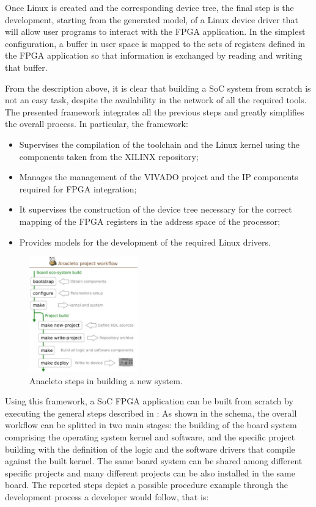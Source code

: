 Once Linux is created and the corresponding device tree, the final step is the development, starting from the generated model, of a Linux device driver that will allow user programs to interact with the FPGA application. In the simplest configuration, a buffer in user space is mapped to the sets of registers defined in the FPGA application so that information is exchanged by reading and writing that buffer.

From the description above, it is clear that building a SoC system from scratch is not an easy task, despite the availability in the network of all the required tools. The presented framework integrates all the previous steps and greatly simplifies the overall process. In particular, the framework:
\begin{itemize}
    \item Supervises the compilation of the toolchain and the Linux kernel using the components taken from the XILINX repository;
    \item Manages the management of the VIVADO project and the IP components required for FPGA integration;
    \item It supervises the construction of the device tree necessary for the correct mapping of the FPGA registers in the address space of the processor;
    \item Provides models for the development of the required Linux drivers.
\end{itemize}


\begin{figure}
    \centering
    \includegraphics[height=5cm]{img/anacleto.jpg}
    \caption{Anacleto steps in building a new system. }
    \label{fig:anacleto_steps}
\end{figure}
Using this framework, a SoC FPGA application can be built from scratch by executing the general steps described in \Figure{\ref{fig:anacleto_steps}}:
As shown in the schema, the overall workflow can be splitted in two main stages: the building of the board system comprising the operating system kernel and software, and the specific project building with the definition of the logic and the software drivers that compile against the built kernel. The same board system can be shared among different specific projects and many different projects can be also installed in the same board. The reported steps depict a possible procedure example through the development process a developer would follow, that is:

